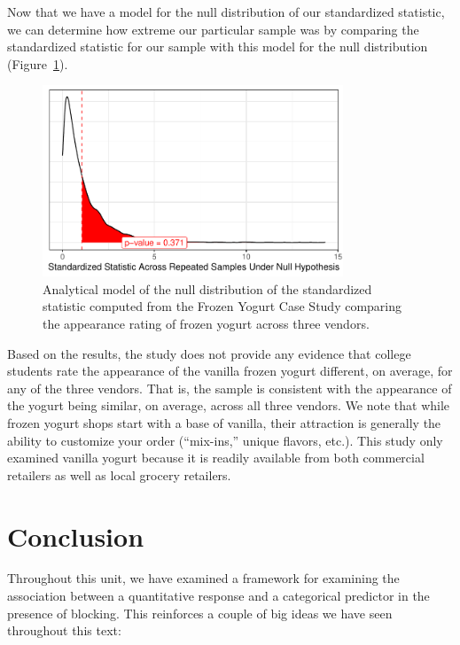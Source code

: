 \documentclass[
  letterpaper,
  DIV=11,
  numbers=noendperiod]{scrreprt}
\theoremstyle{definition}
\theoremstyle{definition}
\theoremstyle{plain}
\theoremstyle{remark}
\begin{document}
Now that we have a model for the null distribution of our standardized
statistic, we can determine how extreme our particular sample was by
comparing the standardized statistic for our sample with this model for
the null distribution (Figure~\ref{fig-blockrecap-null-distribution}).

\begin{figure}

{\centering \includegraphics[width=0.8\textwidth,height=\textheight]{./images/fig-blockrecap-null-distribution-1.pdf}

}

\caption{\label{fig-blockrecap-null-distribution}Analytical model of the
null distribution of the standardized statistic computed from the Frozen
Yogurt Case Study comparing the appearance rating of frozen yogurt
across three vendors.}

\end{figure}

Based on the results, the study does not provide any evidence that
college students rate the appearance of the vanilla frozen yogurt
different, on average, for any of the three vendors. That is, the sample
is consistent with the appearance of the yogurt being similar, on
average, across all three vendors. We note that while frozen yogurt
shops start with a base of vanilla, their attraction is generally the
ability to customize your order (``mix-ins,'' unique flavors, etc.).
This study only examined vanilla yogurt because it is readily available
from both commercial retailers as well as local grocery retailers.

\hypertarget{conclusion-1}{%
\section{Conclusion}\label{conclusion-1}}

Throughout this unit, we have examined a framework for examining the
association between a quantitative response and a categorical predictor
in the presence of blocking. This reinforces a couple of big ideas we
have seen throughout this text:
\end{document}
